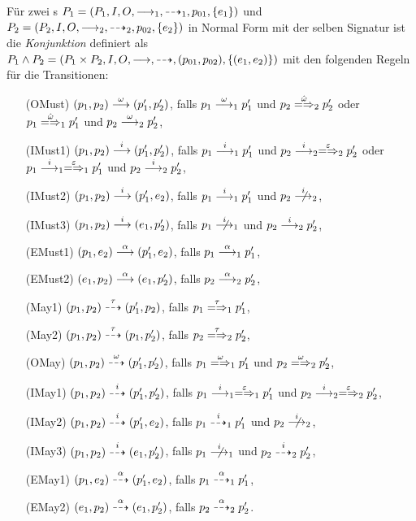 \begin{Def}[Konjunktion]
  \label{FehlerConjDef}
  Für zwei \MEIO{}s $P_1 = (P_1,I,O,\must _1,\may _1,p_{01},\{e_1\})$ und $P_2
  = (P_2,I,O,\must _2,\may _2,p_{02},\{e_2\})$ in Normal Form mit der selben
  Signatur ist die \emph{Konjunktion} definiert als $P_1\land P_2 =
  (P_1\times P_2, I, O, \must, \may ,(p_{01},p_{02}),\{(e_1,e_2)\})$ mit den
  folgenden Regeln für die Transitionen:
  \begin{itemize}
    \item[(OMust)] $(p_1,p_2) \must[\omega] (p'_1,p'_2)$, falls
      $p_1 \must[\omega]_1 p'_1$ und $p_2 \weakmay[\hat{\omega}]_2 p'_2$ oder
      $p_1 \weakmay[\hat{\omega}]_1 p'_1$ und $p_2 \must[\omega]_2 p'_2$,
    \item[(IMust1)] $(p_1,p_2) \must[i] (p'_1,p'_2)$, falls $p_1 \must[i]_1
      p'_1$ und $p_2 \must[i]_2 \weakmay[\varepsilon]_2 p'_2$ oder $p_1
      \must[i]_1 \weakmay[\varepsilon]_1 p'_1$ und $p_2 \must[i]_2 p'_2$,
    \item[(IMust2)] $(p_1,p_2) \must[i] (p'_1,e_2)$, falls $p_1 \must[i]_1
      p'_1$ und $p_2 \nmust[i]_2$,
    \item[(IMust3)] $(p_1,p_2) \must[i] (e_1,p'_2)$, falls $p_1 \nmust[i]_1$
      und $p_2 \must[i]_2 p'_2$,
    \item[(EMust1)] $(p_1,e_2) \must[\alpha] (p'_1,e_2)$, falls $p_1
      \must[\alpha]_1 p'_1$,
    \item[(EMust2)] $(e_1,p_2) \must[\alpha] (e_1,p'_2)$, falls $p_2
      \must[\alpha]_2 p'_2$,
    \item[(May1)] $(p_1,p_2) \may[\tau] (p'_1,p_2)$, falls $p_1
      \weakmay[\tau]_1 p'_1$,
    \item[(May2)] $(p_1,p_2) \may[\tau] (p_1,p'_2)$, falls $p_2
      \weakmay[\tau]_2 p'_2$,
    \item[(OMay)] $(p_1,p_2) \may[\omega] (p'_1,p'_2)$, falls $p_1
      \weakmay[\omega]_1 p'_1$ und $p_2 \weakmay[\omega]_2 p'_2$,
    \item[(IMay1)] $(p_1,p_2) \may[i] (p'_1,p'_2)$, falls $p_1 \must[i]_1
      \weakmay[\varepsilon]_1 p'_1$ und $p_2 \must[i]_2 \weakmay[\varepsilon]_2
      p'_2$,
    \item[(IMay2)] $(p_1,p_2) \may[i] (p'_1,e_2)$, falls $p_1 \may[i]_1 p'_1$
      und $p_2 \nmust[i]_2$,
    \item[(IMay3)] $(p_1,p_2) \may[i] (e_1,p'_2)$, falls $p_1 \nmust[i]_1$ und
      $p_2 \may[i]_2 p'_2$,
    \item[(EMay1)] $(p_1,e_2) \may[\alpha] (p'_1,e_2)$, falls $p_1
      \may[\alpha]_1 p'_1$,
    \item[(EMay2)] $(e_1,p_2) \may[\alpha] (e_1,p'_2)$, falls $p_2
      \may[\alpha]_2 p'_2$.
  \end{itemize}
\end{Def}

